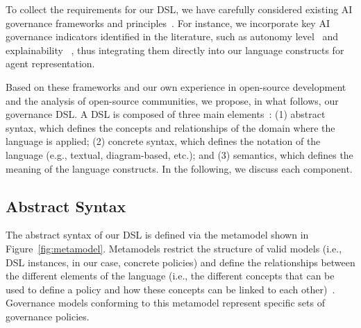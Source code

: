 To collect the requirements for our DSL, we have carefully considered existing AI governance frameworks and principles~\cite{DBLP:journals/computer/ChestermanGHS24}. 
For instance, we incorporate key AI governance indicators identified in the literature, such as autonomy level~\cite{DBLP:journals/nature/RahwanCOBBBCCCJ19} and explainability~\cite{DBLP:journals/inffus/ArrietaRSBTBGGM20}%
, thus integrating them directly into our language constructs for agent representation.

Based on these frameworks and our own experience in open-source development and the analysis of open-source communities, we propose, in what follows, our governance DSL.
A DSL is composed of three main elements~\cite{DBLP:books/sp/WasowskiB23}: 
(1) abstract syntax, which defines the concepts and relationships of the domain where the language is applied; 
(2) concrete syntax, which defines the notation of the language (e.g., textual, diagram-based, etc.); and 
(3) semantics, which defines the meaning of the language constructs.
In the following, we discuss each component. 

\subsection{Abstract Syntax}
\label{sec:our-dsl:abstract-syntax}

The abstract syntax of our DSL is defined via the metamodel shown in Figure~\ref{fig:metamodel}. 
Metamodels restrict the structure of valid models (i.e., DSL instances, in our case, concrete policies) and define the relationships between the different elements of the language (i.e., the different concepts that can be used to define a policy and how these concepts can be linked to each other)~\cite{DBLP:series/synthesis/2017Brambilla}.
Governance models conforming to this metamodel represent specific sets of governance policies.

